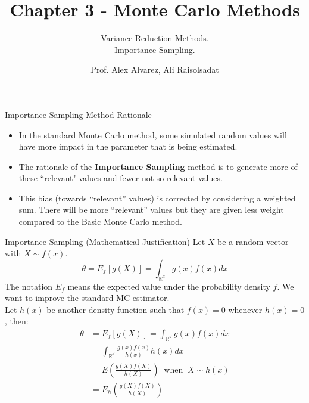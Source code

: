 \documentclass[8pt]{beamer}
\title{Chapter 3 - Monte Carlo Methods}
\subtitle{Variance Reduction Methods.\\ Importance Sampling.}
\author{Prof. Alex Alvarez, Ali Raisolsadat}
\institute{School of Mathematical and Computational Sciences \\ University of Prince Edward Island}
\date{} %
\begin{document}
\maketitle

\begin{frame}{Importance Sampling Method Rationale}
\begin{itemize}
	\item In the standard Monte Carlo method, some simulated random values will have more impact in the parameter that is being estimated.
	\item The rationale of the \textbf{Importance Sampling} method is to generate more
of these ``relevant" values and fewer not-so-relevant values. 
	\item This bias (towards ``relevant'' values) is corrected by considering a weighted sum.
There will be more ``relevant'' values but they are given less weight compared to the Basic Monte Carlo method.
\end{itemize}
\end{frame}

\begin{frame}{Importance Sampling (Mathematical Justification)}
Let $X$ be a random vector with $X \sim f(x)$.\\
\begin{equation*}
    \theta=E_f[g(X)]=\int_{\mathbb{R}^d} g(x)f(x)dx
\end{equation*}
The notation $E_f$ means the expected value under the probability density $f$.
We want to improve the standard MC estimator. \\
Let $h(x)$ be another density function such that $f(x)=0$ whenever $h(x)=0$, then:
\begin{align*}
	\theta &= E_f[g(X)] = \int_{\mathbb{R}^d} g(x)f(x)dx \\
		   & = \int_{\mathbb{R}^d} \frac{g(x)f(x)}{h(x)}h(x) dx  \\
 		   &= E \left(\frac{g(X) f(X)}{h(X)}\right)\;\; \text{when}\;\; X \sim h(x)\\
           &= E_h \left( \frac{g(X) f(X)}{h(X)}\right)
\end{align*}
\end{frame}
\end{document}
